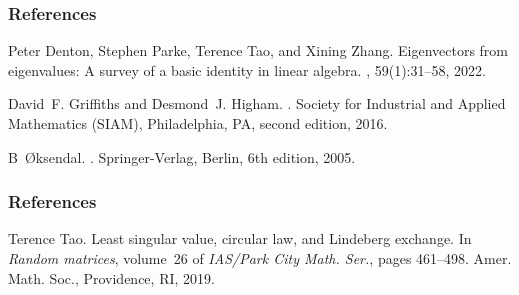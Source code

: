 \documentclass{beamer}
\begin{document}
\begin{frame}\frametitle{References}
  

 \begin{thebibliography}{}

Peter Denton, Stephen Parke, Terence Tao, and Xining Zhang.
\newblock Eigenvectors from eigenvalues: {A} survey of a basic identity in
  linear algebra.
, 59(1):31--58, 2022.

David~F. Griffiths and Desmond~J. Higham.
.
\newblock Society for Industrial and Applied Mathematics (SIAM), Philadelphia,
  PA, second edition, 2016.

B~{\O}ksendal.
.
\newblock Springer-Verlag, Berlin, 6th edition, 2005.
\end{thebibliography}
\end{frame}

\begin{frame}\frametitle{References}
  

 \begin{thebibliography}{}
Terence Tao.
\newblock Least singular value, circular law, and {L}indeberg exchange.
\newblock In {\em Random matrices}, volume~26 of {\em IAS/Park City Math.
  Ser.}, pages 461--498. Amer. Math. Soc., Providence, RI, 2019.

\end{thebibliography}

\vfill
 \end{frame}
\end{document}
